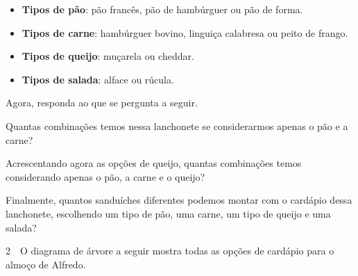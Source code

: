 \begin{itemize}
  \item \textbf{Tipos de pão}: pão francês, pão de hambúrguer ou pão de forma.
  \item \textbf{Tipos de carne}: hambúrguer bovino, linguiça calabresa ou peito de frango.
  \item \textbf{Tipos de queijo}: muçarela ou cheddar.
  \item \textbf{Tipos de salada}: alface ou rúcula.
\end{itemize}

Agora, responda ao que se pergunta a seguir.

\begin{escolha}
\item
  Quantas combinações temos nessa lanchonete se considerarmos apenas o
  pão e a carne?

\begin{mdframed}[linewidth=2pt,linecolor=salmao,roundcorner=2pt]
\vspace{3cm}
\end{mdframed}

\item
  Acrescentando agora as opções de queijo, quantas combinações temos
  considerando apenas o pão, a carne e o queijo?

\begin{mdframed}[linewidth=2pt,linecolor=salmao,roundcorner=2pt]
\vspace{5cm}
\end{mdframed}

\item
  Finalmente, quantos sanduíches diferentes podemos montar com o
  cardápio dessa lanchonete, escolhendo um tipo de pão, uma carne, um tipo de queijo e uma
  salada?

\begin{mdframed}[linewidth=2pt,linecolor=salmao,roundcorner=2pt]
\vspace{7cm}
\end{mdframed}

\end{escolha}

\num{2}　O diagrama de árvore a seguir mostra todas as opções de cardápio para o
almoço de Alfredo.


